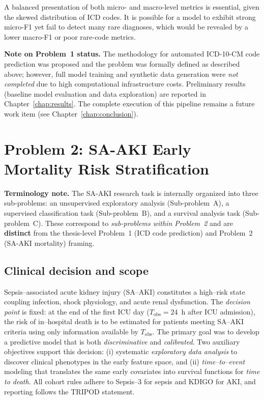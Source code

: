 A balanced presentation of both micro- and macro-level metrics is essential, given the skewed distribution of ICD codes. It is possible for a model to exhibit strong micro-F1 yet fail to detect many rare diagnoses, which would be revealed by a lower macro-F1 or poor rare-code metrics.

\bigskip
\noindent\textbf{Note on Problem~1 status.} The methodology for automated ICD-10-CM code prediction was proposed and the problem was formally defined as described above; however, full model training and synthetic data generation were \emph{not completed} due to high computational infrastructure costs. Preliminary results (baseline model evaluation and data exploration) are reported in Chapter~\ref{chap:results}. The complete execution of this pipeline remains a future work item (see Chapter~\ref{chap:conclusion}).


\section{Problem 2: SA-AKI Early Mortality Risk Stratification}
\label{sec:saaki_problem}

\noindent\textbf{Terminology note.} The SA-AKI research task is internally organized into three sub-problems: an unsupervised exploratory analysis (Sub-problem~A), a supervised classification task (Sub-problem~B), and a survival analysis task (Sub-problem~C). These correspond to \emph{sub-problems within Problem~2} and are \textbf{distinct} from the thesis-level Problem~1 (ICD code prediction) and Problem~2 (SA-AKI mortality) framing.

\bigskip

\subsection{Clinical decision and scope}
Sepsis–associated acute kidney injury (SA--AKI) constitutes a high–risk state coupling infection, shock physiology, and acute renal dysfunction. The \emph{decision point} is fixed: at the end of the first ICU day ($T_{\mathrm{obs}}{=}24$~h after ICU admission), the risk of in–hospital death is to be estimated for patients meeting SA--AKI criteria using only information available by $T_{\mathrm{obs}}$. The primary goal was to develop a predictive model that is both \emph{discriminative} and \emph{calibrated}. Two auxiliary objectives support this decision: (i) systematic \emph{exploratory data analysis} to discover clinical phenotypes in the early feature space, and (ii) \emph{time–to–event} modeling that translates the same early covariates into survival functions for \emph{time to death}. All cohort rules adhere to Sepsis--3 for sepsis and KDIGO for AKI, and reporting follows the TRIPOD statement.

